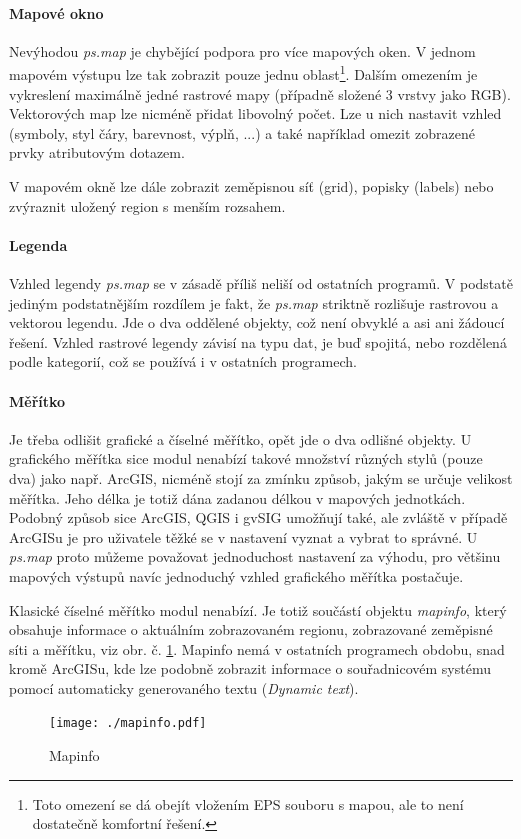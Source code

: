 \documentclass[a4paper,12pt,draft]{article}
\newcommand{\modul}[1]{\emph{#1}}
\begin{document}
\paragraph*{Mapové okno}
Nevýhodou \modul{ps.map} je chybějící podpora pro více mapových oken. V jednom mapovém výstupu lze tak zobrazit pouze jednu oblast\footnote{Toto omezení se dá obejít vložením EPS souboru s mapou, ale to není dostatečně komfortní řešení.}. Dalším omezením je vykreslení maximálně jedné rastrové mapy (případně složené 3 vrstvy jako RGB). Vektorových map lze nicméně přidat libovolný počet. Lze u nich nastavit vzhled (symboly, styl čáry, barevnost, výplň, ...) a také například omezit zobrazené prvky atributovým dotazem. 

V mapovém okně lze dále zobrazit zeměpisnou síť (grid), popisky (labels) nebo zvýraznit uložený region s menším rozsahem.

\paragraph*{Legenda}
Vzhled legendy \modul{ps.map} se v zásadě příliš neliší od ostatních programů. V podstatě jediným podstatnějším rozdílem je fakt, že \modul{ps.map} striktně rozlišuje rastrovou a vektorou legendu. Jde o dva oddělené objekty, což není obvyklé a asi ani žádoucí řešení. Vzhled rastrové legendy závisí na typu dat, je buď spojitá, nebo rozdělená podle kategorií, což se používá i v ostatních programech.

\paragraph*{Měřítko}
Je třeba odlišit grafické a číselné měřítko, opět jde o dva odlišné objekty.
U grafického měřítka sice modul nenabízí takové množství různých stylů (pouze dva) jako např. ArcGIS, nicméně stojí za zmínku způsob, jakým se určuje velikost měřítka. Jeho délka je totiž dána zadanou délkou v mapových jednotkách. Podobný způsob sice ArcGIS, QGIS i gvSIG umožňují také, ale zvláště v případě ArcGISu je pro uživatele těžké se v nastavení vyznat a vybrat to správné. U \modul{ps.map} proto můžeme považovat jednoduchost nastavení za výhodu, pro většinu mapových výstupů navíc jednoduchý vzhled grafického měřítka postačuje.

Klasické číselné měřítko modul nenabízí. Je totiž součástí objektu \emph{mapinfo}, který obsahuje informace o aktuálním zobrazovaném regionu, zobrazované zeměpisné síti a měřítku, viz obr. č. \ref{fig:mapinfo}. Mapinfo nemá v ostatních programech obdobu, snad kromě ArcGISu, kde lze podobně zobrazit informace o souřadnicovém systému pomocí automaticky generovaného textu (\emph{Dynamic text}). 
\begin{figure}[h!]
    \centering
    \texttt{[image: ./mapinfo.pdf]}
    \caption{Mapinfo}
    \label{fig:mapinfo}
\end{figure}
\end{document}

